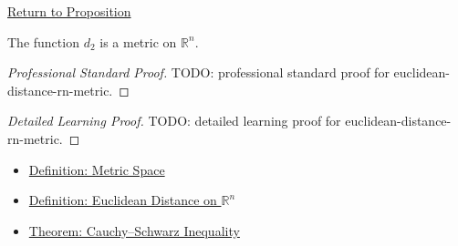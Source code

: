\newpage
{}
\label{prf:euclidean-distance-rn-metric}

\begin{remark*}[Return]
\hyperref[prop:euclidean-distance-rn-metric]{Return to Proposition}
\end{remark*}

\begin{proposition*}
The function \(d_2\) is a metric on \(\mathbb{R}^n\).
\end{proposition*}

\begin{proof}[Professional Standard Proof]
\LRAProofBodyStart
TODO: professional standard proof for euclidean-distance-rn-metric.
\end{proof}

\begin{proof}[Detailed Learning Proof]
\LRAProofBodyStart
TODO: detailed learning proof for euclidean-distance-rn-metric.
\end{proof}

\begin{remark*}
\end{remark*}

\begin{dependencies}
\begin{itemize}
  \item \hyperref[def:metric-space]{Definition: Metric Space}
  \item \hyperref[def:euclidean-distance-rn]{Definition: Euclidean Distance on \(\mathbb{R}^n\)}
  \item \hyperref[thm:cauchy-schwarz-inequality]{Theorem: Cauchy--Schwarz Inequality}
\end{itemize}
\end{dependencies}

\clearpage
